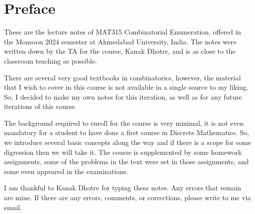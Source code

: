 %

\chapter*{Preface}

These are the lecture notes of MAT315 Combinatorial Enumeration, offered in the Monsoon 2024 semester at Ahmedabad University, India. The notes were written down by the TA for the course, Kanak Dhotre, and is as close to the classroom teaching as possible.

There are several very good textbooks in combinatorics, however, the material that I wish to cover in this course is not available in a single source to my liking. So, I decided to make my own notes for this iteration, as well as for any future iterations of this course.

The background required to enroll for the course is very minimal, it is not even mandatory for a student to have done a first course in Discrete Mathematics. So, we introduce several basic concepts along the way and if there is a scope for some digression then we will take it. The course is supplemented by some homework assignments, some of the problems in the text were set in those assignments, and some even appeared in the examinations.

I am thankful to Kanak Dhotre for typing these notes. Any errors that remain are mine. If there are any errors, comments, or corrections, please write to me via email.



